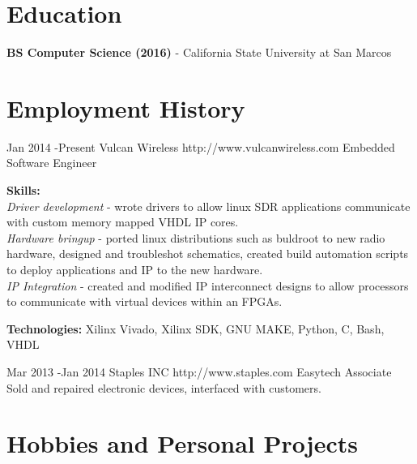 \documentclass[10pt]{article} %
\begin{document}
\section{Education}

\textbf{BS Computer Science (2016)} - California State University at San Marcos




\section{Employment History}

\job
{Jan 2014 -}{Present}
{Vulcan Wireless}
{http://www.vulcanwireless.com}
{Embedded Software Engineer}
{\textbf{Skills:}\\
\textit{Driver development} - wrote drivers to allow linux SDR applications communicate with custom memory mapped VHDL IP cores. \\
\textit{Hardware bringup} - ported linux distributions such as buldroot to new radio hardware, designed and troubleshot schematics, created build automation scripts to deploy applications and IP to the new hardware.\\
\textit{IP Integration} - created and modified IP interconnect designs to allow processors to communicate with virtual devices within an FPGAs.\\
\rule{0mm}{5mm}\textbf{Technologies:} Xilinx Vivado, Xilinx SDK, GNU MAKE, Python, C, Bash, VHDL}


\job
{Mar 2013 -}{Jan 2014}
{Staples INC}
{http://www.staples.com}
{Easytech Associate}
{Sold and repaired electronic devices, interfaced with customers.}


\section {Hobbies and Personal Projects}
\end{document}
